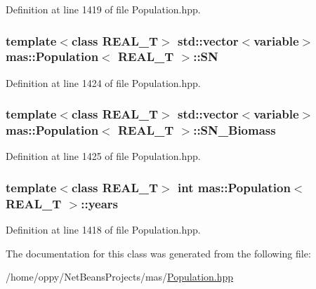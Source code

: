 Definition at line 1419 of file Population.\-hpp.

\hypertarget{classmas_1_1_population_ad305739a2b90cd6947b4f847a0de46eb}{
\subsubsection[{S\-N}]{\setlength{\rightskip}{0pt plus 5cm}template$<$class R\-E\-A\-L\-\_\-\-T$>$ std\-::vector$<${\bf variable}$>$ {\bf mas\-::\-Population}$<$ R\-E\-A\-L\-\_\-\-T $>$\-::S\-N}}\label{classmas_1_1_population_ad305739a2b90cd6947b4f847a0de46eb}


Definition at line 1424 of file Population.\-hpp.

\hypertarget{classmas_1_1_population_ad41f0a54ab4be79a144b1b61a5fe7436}{
\subsubsection[{S\-N\-\_\-\-Biomass}]{\setlength{\rightskip}{0pt plus 5cm}template$<$class R\-E\-A\-L\-\_\-\-T$>$ std\-::vector$<${\bf variable}$>$ {\bf mas\-::\-Population}$<$ R\-E\-A\-L\-\_\-\-T $>$\-::S\-N\-\_\-\-Biomass}}\label{classmas_1_1_population_ad41f0a54ab4be79a144b1b61a5fe7436}


Definition at line 1425 of file Population.\-hpp.

\hypertarget{classmas_1_1_population_a3c5b11c403479bdc518727551791ed21}{
\subsubsection[{years}]{\setlength{\rightskip}{0pt plus 5cm}template$<$class R\-E\-A\-L\-\_\-\-T$>$ int {\bf mas\-::\-Population}$<$ R\-E\-A\-L\-\_\-\-T $>$\-::years}}\label{classmas_1_1_population_a3c5b11c403479bdc518727551791ed21}


Definition at line 1418 of file Population.\-hpp.



The documentation for this class was generated from the following file\-:\begin{DoxyCompactItemize}
\item 
/home/oppy/\-Net\-Beans\-Projects/mas/\hyperlink{_population_8hpp}{Population.\-hpp}\end{DoxyCompactItemize}
